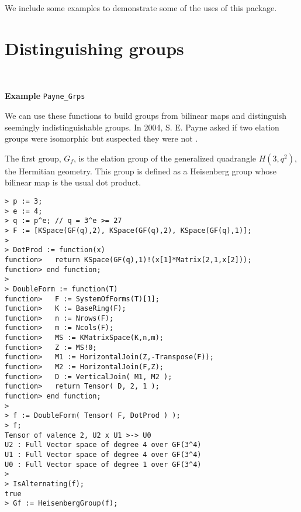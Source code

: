 We include some examples to demonstrate some of the uses of this package.

\section{Distinguishing groups}~

\begin{framed} {\bf Example} {\tt Payne\_Grps}\\
{\small We can use these functions to build groups from bilinear maps and distinguish seemingly indistinguishable groups. 
In 2004, S. E. Payne asked if two elation groups were isomorphic but suspected they were not \cite{Payne:elation-grps}.

The first group, $G_f$, is the elation group of the generalized quadrangle $H(3,q^2)$, the Hermitian geometry.
This group is defined as a Heisenberg group whose bilinear map is the usual dot product.
\begin{lstlisting}[frame=single,basicstyle=\ttfamily\color{black!30!
teal},backgroundcolor=\color{white!70!gray}]
> p := 3;
> e := 4;
> q := p^e; // q = 3^e >= 27
> F := [KSpace(GF(q),2), KSpace(GF(q),2), KSpace(GF(q),1)];
> 
> DotProd := function(x)
function>   return KSpace(GF(q),1)!(x[1]*Matrix(2,1,x[2]));
function> end function;
> 
> DoubleForm := function(T)
function>   F := SystemOfForms(T)[1];
function>   K := BaseRing(F);
function>   n := Nrows(F);
function>   m := Ncols(F);
function>   MS := KMatrixSpace(K,n,m);
function>   Z := MS!0;
function>   M1 := HorizontalJoin(Z,-Transpose(F));
function>   M2 := HorizontalJoin(F,Z);
function>   D := VerticalJoin( M1, M2 );
function>   return Tensor( D, 2, 1 );
function> end function;
> 
> f := DoubleForm( Tensor( F, DotProd ) );
> f;
Tensor of valence 2, U2 x U1 >-> U0
U2 : Full Vector space of degree 4 over GF(3^4)
U1 : Full Vector space of degree 4 over GF(3^4)
U0 : Full Vector space of degree 1 over GF(3^4)
> 
> IsAlternating(f);
true
> Gf := HeisenbergGroup(f);
\end{lstlisting} 

}
\end{framed}
